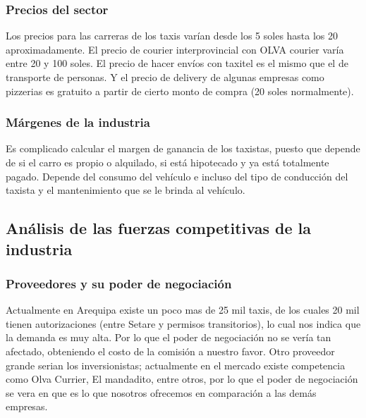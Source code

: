 \subsubsection{Precios del sector}
Los precios para las carreras de los taxis varían desde los 5 soles hasta los 20 aproximadamente. El precio de courier interprovincial con OLVA courier varía entre 20 y 100 soles. El precio de hacer envíos con taxitel es el mismo que el de transporte de personas. Y el precio de delivery de algunas empresas como pizzerias es gratuito a partir de cierto monto de compra (20 soles normalmente).

\subsubsection{Márgenes de la industria}
Es complicado calcular el margen de ganancia de los taxistas, puesto que depende de si el carro es propio o alquilado, si está hipotecado y ya está totalmente pagado. Depende del consumo del vehículo e incluso del tipo de conducción del taxista y el mantenimiento que se le brinda al vehículo.


\subsection{Análisis de las fuerzas competitivas de la industria}

\subsubsection{Proveedores y su poder de negociación}
Actualmente en Arequipa existe un poco mas de 25 mil taxis, de los cuales 20 mil tienen autorizaciones (entre Setare y permisos transitorios), lo cual nos indica que la demanda es muy alta. Por lo que el poder de negociación  no se vería tan afectado, obteniendo el costo de la comisión a nuestro favor. 
Otro proveedor grande serian los inversionistas; actualmente en el mercado existe competencia como Olva Currier, El mandadito, entre otros, por lo que el poder de negociación se vera en que es lo que nosotros ofrecemos en comparación a las demás empresas.

